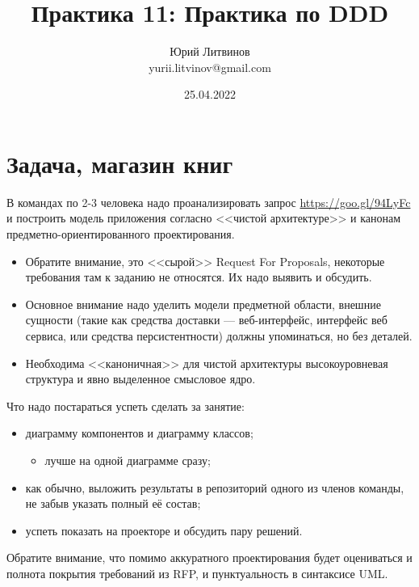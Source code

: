 \documentclass[a5paper]{article}
\title{Практика 11: Практика по DDD}
\author{Юрий Литвинов\\\small{yurii.litvinov@gmail.com}}
\date{25.04.2022}
\begin{document}
\maketitle
\thispagestyle{empty}

\section{Задача, магазин книг}

В командах по 2-3 человека надо проанализировать запрос \url{ https://goo.gl/94LyFc} и построить модель приложения согласно <<чистой архитектуре>> и канонам предметно-ориентированного проектирования.

\begin{itemize}
    \item Обратите внимание, это <<сырой>> Request For Proposals, некоторые требования там к заданию не относятся. Их надо выявить и обсудить.
    \item Основное внимание надо уделить модели предметной области, внешние сущности (такие как средства доставки --- веб-интерфейс, интерфейс веб сервиса, или средства персистентности) должны упоминаться, но без деталей.
    \item Необходима <<каноничная>> для чистой архитектуры высокоуровневая структура и явно выделенное смысловое ядро.
\end{itemize}

Что надо постараться успеть сделать за занятие:

\begin{itemize}
    \item диаграмму компонентов и диаграмму классов;
    \begin{itemize}
        \item лучше на одной диаграмме сразу;
    \end{itemize}
    \item как обычно, выложить результаты в репозиторий одного из членов команды, не забыв указать полный её состав;
    \item успеть показать на проекторе и обсудить пару решений.
\end{itemize}

Обратите внимание, что помимо аккуратного проектирования будет оцениваться и полнота покрытия требований из RFP, и пунктуальность в синтаксисе UML.
\end{document}
